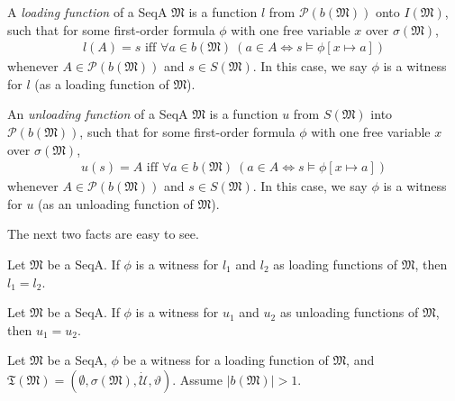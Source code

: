 \documentclass[12pt]{article}
\numberwithin{equation}{section}
\begin{document}
\begin{defi}
A \emph{loading function} of a SeqA $\mathfrak{M}$ is a function $l$ from $\mathcal{P}(b(\mathfrak{M}))$ onto $I(\mathfrak{M})$, such that for some first-order formula $\phi$ with one free variable $x$ over $\sigma(\mathfrak{M})$,
\begin{align*}
    l(A) = s \text{ iff } \forall a \in b(\mathfrak{M}) \ (a \in A \iff s \models \phi[x \mapsto a])
\end{align*}
whenever $A \in \mathcal{P}(b(\mathfrak{M}))$ and $s \in S(\mathfrak{M})$. In this case, we say $\phi$ is a witness for $l$ (as a loading function of $\mathfrak{M}$).
\end{defi}

\begin{defi}
An \emph{unloading function} of a SeqA $\mathfrak{M}$ is a function $u$ from $S(\mathfrak{M})$ into $\mathcal{P}(b(\mathfrak{M}))$, such that for some first-order formula $\phi$ with one free variable $x$ over $\sigma(\mathfrak{M})$,
\begin{align*}
    u(s) = A \text{ iff } \forall a \in b(\mathfrak{M}) \ (a \in A \iff s \models \phi[x \mapsto a])
\end{align*}
whenever $A \in \mathcal{P}(b(\mathfrak{M}))$ and $s \in S(\mathfrak{M})$. In this case, we say $\phi$ is a witness for $u$ (as an unloading function of $\mathfrak{M}$).
\end{defi}

The next two facts are easy to see.

\begin{fact}\label{fact215}
Let $\mathfrak{M}$ be a SeqA. If $\phi$ is a witness for $l_1$ and $l_2$ as loading functions of $\mathfrak{M}$, then $l_1 = l_2$.
\end{fact}

\begin{fact}\label{fact216}
Let $\mathfrak{M}$ be a SeqA. If $\phi$ is a witness for $u_1$ and $u_2$ as unloading functions of $\mathfrak{M}$, then $u_1 = u_2$.
\end{fact}

Let $\mathfrak{M}$ be a SeqA, $\phi$ be a witness for a loading function of $\mathfrak{M}$, and $\mathfrak{T}(\mathfrak{M}) = (\emptyset, \sigma(\mathfrak{M}), \dot{\mathcal{U}}, \vartheta)$. Assume $|b(\mathfrak{M})| > 1$. 
\end{document}

